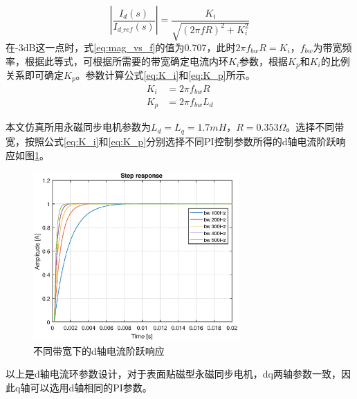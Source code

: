 \begin{equation}\label{eq:mag_vs_f}
\left|\frac{I_{d}(s)}{I_{d\_ref}(s)}\right|=\frac{K_{i}}{\sqrt{(2 \pi fR)^2+K_{i}^{2}}}
\end{equation}
在-3dB这一点时，式\ref{eq:mag_vs_f}的值为0.707，此时$2\pi f_{bw}R=K_{i}$，$f_{bw}$为带宽频率，根据此等式，可根据所需要的带宽确定电流内环$K_{i}$参数，根据$K_{p}$和$K_{i}$的比例关系即可确定$K_{p}$。参数计算公式\ref{eq:K_i}和\ref{eq:K_p}所示。
\begin{align}
K_{i} &= 2\pi f_{bw} R\label{eq:K_i}\\
K_{p} &= 2\pi f_{bw} L_{d}\label{eq:K_p}
\end{align}

本文仿真所用永磁同步电机参数为$L_{d}=L_{q}=1.7mH$，$R=0.353\Omega$。选择不同带宽，按照公式\ref{eq:K_i}和\ref{eq:K_p}分别选择不同PI控制参数所得的d轴电流阶跃响应如图\ref{fig:current_step}。
\begin{figure}[H]
	\centering
	\includegraphics[width=0.7\textwidth]{figs/current_step.eps}
	\caption{不同带宽下的d轴电流阶跃响应}
	\label{fig:current_step}
\end{figure}
以上是d轴电流环参数设计，对于表面贴磁型永磁同步电机，dq两轴参数一致，因此q轴可以选用d轴相同的PI参数。
